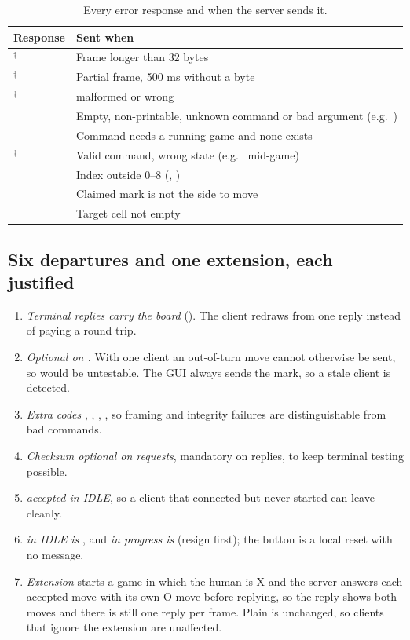 \begin{table}[t]
\centering
\caption{Every error response and when the server sends it.}
\label{tab:errors}
\footnotesize
\begin{tabular}{@{}L{2.35cm}L{5.65cm}@{}}
\toprule
Response & Sent when \\
\midrule
{}$^\dagger$ & Frame longer than 32 bytes \\
$^\dagger$ & Partial frame, 500 ms without a byte \\
$^\dagger$ &  malformed or wrong \\
 & Empty, non-printable, unknown command or bad argument (e.g.\ ) \\
 & Command needs a running game and none exists \\
$^\dagger$ & Valid command, wrong state (e.g.\  mid-game) \\
 & Index outside 0--8 (, ) \\
 & Claimed mark is not the side to move \\
 & Target cell not empty \\
\bottomrule
\end{tabular}
\end{table}

\subsection{Six departures and one extension, each justified}
\begin{enumerate}\setlength\itemsep{0pt}
\item \emph{Terminal replies carry the board} (). The client redraws from one reply instead of paying a  round trip.
\item \emph{Optional  on .} With one client an out-of-turn move cannot otherwise be sent, so  would be untestable. The GUI always sends the mark, so a stale client is detected.
\item \emph{Extra codes} , , , , so framing and integrity failures are distinguishable from bad commands.
\item \emph{Checksum optional on requests}, mandatory on replies, to keep terminal testing possible.
\item \emph{ accepted in IDLE}, so a client that connected but never started can leave cleanly.
\item \emph{ in IDLE is }, and \emph{ in progress is } (resign first); the button is a local reset with no message.
\item \emph{Extension } starts a game in which the human is X and the server answers each accepted move with its own O move before replying, so the reply shows both moves and there is still one reply per frame. Plain  is unchanged, so clients that ignore the extension are unaffected.
\end{enumerate}

